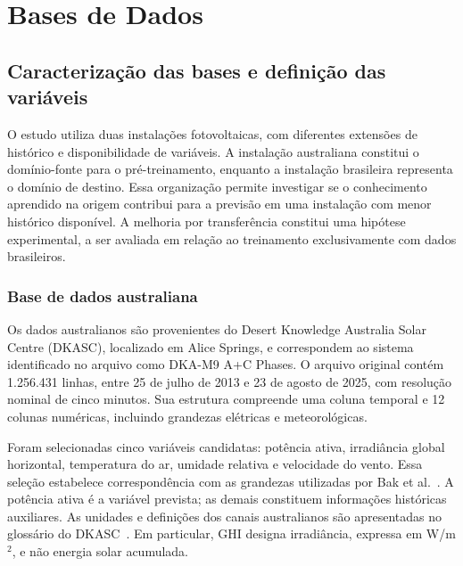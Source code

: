 \chapter{Bases de Dados}
\label{cap:bases_dados}

\section{Caracterização das bases e definição das variáveis}

O estudo utiliza duas instalações fotovoltaicas, com diferentes extensões de histórico e disponibilidade de variáveis. A instalação australiana constitui o domínio-fonte para o pré-treinamento, enquanto a instalação brasileira representa o domínio de destino. Essa organização permite investigar se o conhecimento aprendido na origem contribui para a previsão em uma instalação com menor histórico disponível. A melhoria por transferência constitui uma hipótese experimental, a ser avaliada em relação ao treinamento exclusivamente com dados brasileiros.

\subsection{Base de dados australiana}
\label{subsec:base_australiana}

Os dados australianos são provenientes do Desert Knowledge Australia Solar Centre (DKASC), localizado em Alice Springs, e correspondem ao sistema identificado no arquivo como DKA-M9 A+C Phases. O arquivo original contém 1.256.431 linhas, entre 25 de julho de 2013 e 23 de agosto de 2025, com resolução nominal de cinco minutos. Sua estrutura compreende uma coluna temporal e 12 colunas numéricas, incluindo grandezas elétricas e meteorológicas.

Foram selecionadas cinco variáveis candidatas: potência ativa, irradiância global horizontal, temperatura do ar, umidade relativa e velocidade do vento. Essa seleção estabelece correspondência com as grandezas utilizadas por Bak et al.\ \cite{bak2025transfer}. A potência ativa é a variável prevista; as demais constituem informações históricas auxiliares. As unidades e definições dos canais australianos são apresentadas no glossário do DKASC\ \cite{dkasc_glossary}. Em particular, GHI designa irradiância, expressa em W/m$^2$, e não energia solar acumulada.

